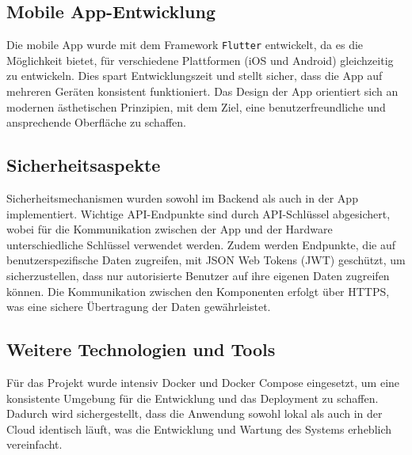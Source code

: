\subsection{Mobile App-Entwicklung}
Die mobile App wurde mit dem Framework \texttt{Flutter} entwickelt, da es die Möglichkeit bietet, 
für verschiedene Plattformen (iOS und Android) gleichzeitig zu entwickeln. Dies spart 
Entwicklungszeit und stellt sicher, dass die App auf mehreren Geräten konsistent funktioniert. 
Das Design der App orientiert sich an modernen ästhetischen Prinzipien, mit dem Ziel, eine 
benutzerfreundliche und ansprechende Oberfläche zu schaffen.

\subsection{Sicherheitsaspekte}
Sicherheitsmechanismen wurden sowohl im Backend als auch in der App implementiert. Wichtige 
API-Endpunkte sind durch API-Schlüssel abgesichert, wobei für die Kommunikation zwischen der App 
und der Hardware unterschiedliche Schlüssel verwendet werden. Zudem werden Endpunkte, die auf 
benutzerspezifische Daten zugreifen, mit JSON Web Tokens (JWT) geschützt, um sicherzustellen, 
dass nur autorisierte Benutzer auf ihre eigenen Daten zugreifen können. Die Kommunikation zwischen 
den Komponenten erfolgt über HTTPS, was eine sichere Übertragung der Daten gewährleistet.

\subsection{Weitere Technologien und Tools}
Für das Projekt wurde intensiv Docker und Docker Compose eingesetzt, um eine konsistente Umgebung 
für die Entwicklung und das Deployment zu schaffen. Dadurch wird sichergestellt, dass die Anwendung 
sowohl lokal als auch in der Cloud identisch läuft, was die Entwicklung und Wartung des Systems 
erheblich vereinfacht.
